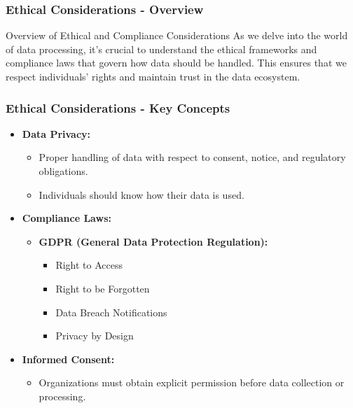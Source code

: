 \documentclass[aspectratio=169]{beamer}
\begin{document}
\begin{frame}[fragile]
    \frametitle{Ethical Considerations - Overview}
    \begin{block}{Overview of Ethical and Compliance Considerations}
        As we delve into the world of data processing, it's crucial to understand the ethical frameworks and compliance laws that govern how data should be handled. This ensures that we respect individuals’ rights and maintain trust in the data ecosystem.
    \end{block}
\end{frame}

\begin{frame}[fragile]
    \frametitle{Ethical Considerations - Key Concepts}
    \begin{itemize}
        \item \textbf{Data Privacy:}
        \begin{itemize}
            \item Proper handling of data with respect to consent, notice, and regulatory obligations.
            \item Individuals should know how their data is used.
        \end{itemize}

        \item \textbf{Compliance Laws:}
        \begin{itemize}
            \item \textbf{GDPR (General Data Protection Regulation):} 
            \begin{itemize}
                \item Right to Access
                \item Right to be Forgotten
                \item Data Breach Notifications
                \item Privacy by Design
            \end{itemize}
        \end{itemize}

        \item \textbf{Informed Consent:}
        \begin{itemize}
            \item Organizations must obtain explicit permission before data collection or processing.
        \end{itemize}
    \end{itemize}
\end{frame}
\end{document}
